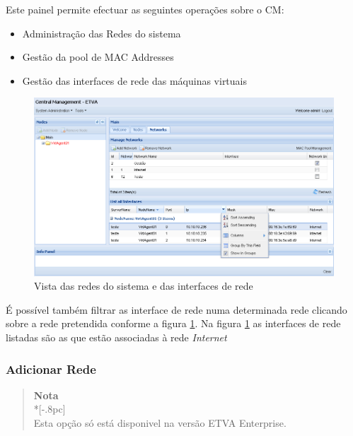 Este painel permite efectuar as seguintes operações sobre o CM:

\begin{itemize}
	\item Administração das Redes do sistema
	\item Gestão da pool de MAC Addresses
	\item Gestão das interfaces de rede das máquinas virtuais 
\end{itemize}

\begin{figure}[H]
	\begin{center}
	\includegraphics[scale=0.5]{screenshots/main_networks.png}
	\caption{Vista das redes do sistema  e das interfaces de rede}
	\label{fig:main_networks}
	\end{center}
\end{figure}

É possível também filtrar as interface de rede numa determinada rede clicando sobre a rede pretendida conforme a figura \ref{fig:main_networks}.
Na figura \ref{fig:main_networks} as interfaces de rede listadas são as que estão associadas à rede \emph{Internet}

\subsubsection{Adicionar Rede}
\label{sec:network_create}

\begin{quote}
	{\large \bf Nota} \\*[-.8pc]
	\underline{\hspace{6in}} \\
	Esta opção só está disponivel na versão ETVA Enterprise.
\end{quote}

